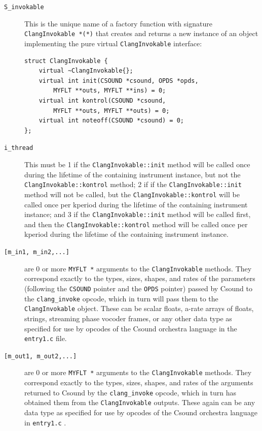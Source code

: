 \documentclass[letterpaper, 12pt]{article}
\begin{document}
\begin{description}
\item[\texttt{S\_invokable}] This is the unique name of a factory function with signature \verb|ClangInvokable *(*)| that creates and returns a new instance of an object implementing the pure virtual \verb|ClangInvokable| interface:

\begin{Verbatim}[fontfamily=courier, xleftmargin=\parindent]
struct ClangInvokable {
	virtual ~ClangInvokable{};
	virtual int init(CSOUND *csound, OPDS *opds, 
		MYFLT **outs, MYFLT **ins) = 0;
	virtual int kontrol(CSOUND *csound, 
		MYFLT **outs, MYFLT **outs) = 0;
	virtual int noteoff(CSOUND *csound) = 0;
};
\end{Verbatim}

\item[\texttt{i\_thread}] This must be 1 if the \verb|ClangInvokable::init| method will be called once during the lifetime of the containing instrument instance, but not the \verb|ClangInvokable::kontrol| method; 2 if if the \verb|ClangInvokable::init| method will not be called, but the \verb|ClangInvokable::kontrol| will be called once per kperiod during the lifetime of the containing instrument instance; and 3 if the \verb|ClangInvokable::init| method will be called first, and then the \verb|ClangInvokable::kontrol| method will be called once per kperiod during the lifetime of the containing instrument instance.
\item[\texttt{[m\_in1, m\_in2,...]}] are 0 or more \verb|MYFLT *| arguments to the \verb|ClangInvokable| methods. They correspond exactly to the types, sizes, shapes, and rates of the parameters (following the \verb|CSOUND| pointer and the \verb|OPDS| pointer) passed by Csound to the \verb|clang_invoke| opcode, which in turn will pass them to the \verb|ClangInvokable| object. These can be scalar floats, a-rate arrays of floats, strings, streaming phase vocoder frames, or any other data type as specified for use by opcodes of the Csound orchestra language in the \verb|entry1.c| \citep{entry1} file.
\item[\texttt{[m\_out1, m\_out2,...]}] are 0 or more \verb|MYFLT *| arguments to the \verb|ClangInvokable| methods. They correspond exactly to the types, sizes, shapes, and rates of the arguments returned to Csound by the \verb|clang_invoke| opcode, which in turn has obtained them from the \verb|ClangInvokable| outputs. These again can be any data type as specified for use by opcodes of the Csound orchestra language in \verb|entry1.c| \citep{entry1}.
\end{description}
\end{document}
